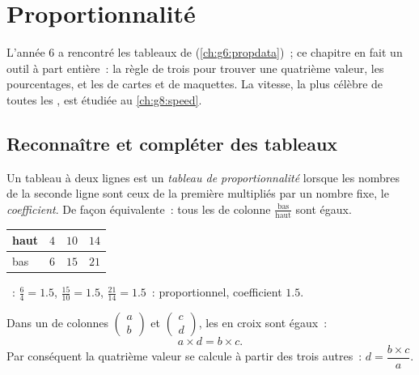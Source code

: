\chapter{Proportionnalité}\label{ch:g7:prop}

L'année 6 a rencontré les tableaux de 
(\cref{ch:g6:propdata})~; ce chapitre en fait un outil à part
entière~: la règle de trois pour trouver une quatrième valeur, les
pourcentages, et les  de cartes et de maquettes. La vitesse,
la plus célèbre de toutes les , est étudiée au
\cref{ch:g8:speed}.

\section{Reconnaître et compléter des tableaux}

\begin{definition}\label{def:g7:prop:table}
Un tableau à deux lignes est un \emph{tableau de
proportionnalité} lorsque les nombres de la
seconde ligne sont ceux de la première multipliés par un nombre fixe,
le \emph{coefficient}. De façon équivalente~: tous les  de
colonne $\frac{\text{bas}}{\text{haut}}$ sont égaux.
\end{definition}

\begin{example}\label{ex:g7:prop:recognize}
\begin{center}
\renewcommand{\arraystretch}{1.3}
\begin{tabular}{l|ccc}
haut & $4$ & $10$ & $14$ \\
\hline
bas & $6$ & $15$ & $21$ \\
\end{tabular}
\end{center}
~: $\frac64 = 1.5$, $\frac{15}{10} = 1.5$,
$\frac{21}{14} = 1.5$~: proportionnel, coefficient $1.5$.
\end{example}

\begin{theorem}\label{thm:g7:prop:cross}
Dans un  de colonnes
$\begin{pmatrix} a \\ b \end{pmatrix}$ et
$\begin{pmatrix} c \\ d \end{pmatrix}$, les  en croix sont
égaux~:
\[
a \times d = b \times c .
\]
Par conséquent la quatrième valeur se calcule à partir des trois
autres~: $d = \dfrac{b \times c}{a}$.
\end{theorem}


